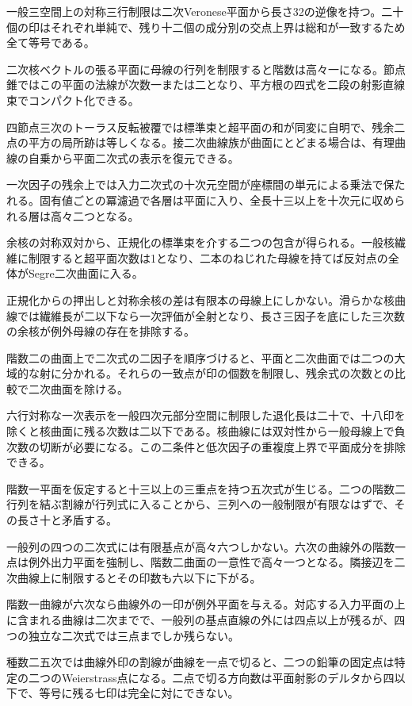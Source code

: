 \documentclass[11pt,a4paper]{ltjsarticle}
\begin{document}
一般三空間上の対称三行制限は二次Veronese平面から長さ32の逆像を持つ。二十個の印はそれぞれ単純で、残り十二個の成分別の交点上界は総和が一致するため全て等号である。

二次核ベクトルの張る平面に母線の行列を制限すると階数は高々一になる。節点錐ではこの平面の法線が次数一または二となり、平方根の四式を二段の射影直線束でコンパクト化できる。

四節点三次のトーラス反転被覆では標準束と超平面の和が同変に自明で、残余二点の平方の局所跡は等しくなる。接二次曲線族が曲面にとどまる場合は、有理曲線の自乗から平面二次式の表示を復元できる。

一次因子の残余上では入力二次式の十次元空間が座標間の単元による乗法で保たれる。固有値ごとの冪濾過で各層は平面に入り、全長十三以上を十次元に収められる層は高々二つとなる。

余核の対称双対から、正規化の標準束を介する二つの包含が得られる。一般核繊維に制限すると超平面次数は1となり、二本のねじれた母線を持てば反対点の全体がSegre二次曲面に入る。

正規化からの押出しと対称余核の差は有限本の母線上にしかない。滑らかな核曲線では繊維長が二以下なら一次評価が全射となり、長さ三因子を底にした三次数の余核が例外母線の存在を排除する。

階数二の曲面上で二次式の二因子を順序づけると、平面と二次曲面では二つの大域的な射に分かれる。それらの一致点が印の個数を制限し、残余式の次数との比較で二次曲面を除ける。

六行対称な一次表示を一般四次元部分空間に制限した退化長は二十で、十八印を除くと核曲面に残る次数は二以下である。核曲線には双対性から一般母線上で負次数の切断が必要になる。この二条件と低次因子の重複度上界で平面成分を排除できる。

階数一平面を仮定すると十三以上の三重点を持つ五次式が生じる。二つの階数二行列を結ぶ割線が行列式に入ることから、三列への一般制限が有限なはずで、その長さ十と矛盾する。

一般列の四つの二次式には有限基点が高々六つしかない。六次の曲線外の階数一点は例外出力平面を強制し、階数二曲面の一意性で高々一つとなる。隣接辺を二次曲線上に制限するとその印数も六以下に下がる。

階数一曲線が六次なら曲線外の一印が例外平面を与える。対応する入力平面の上に含まれる曲線は二次までで、一般列の基点直線の外には四点以上が残るが、四つの独立な二次式では三点までしか残らない。

種数二五次では曲線外印の割線が曲線を一点で切ると、二つの鉛筆の固定点は特定の二つのWeierstrass点になる。二点で切る方向数は平面射影のデルタから四以下で、等号に残る七印は完全に対にできない。
\end{document}
